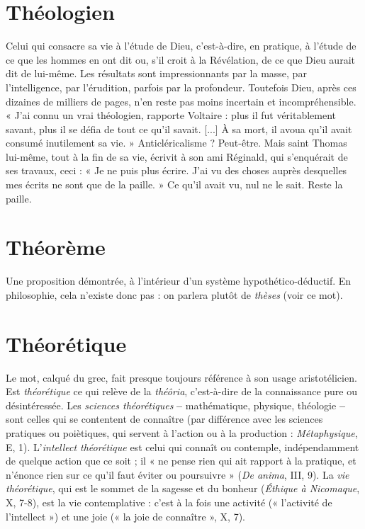 \section{Théologien}
Celui qui consacre sa vie à l’étude de Dieu, c’est-à-dire, en
pratique, à l'étude de ce que les hommes en ont dit ou, s’il
croit à la Révélation, de ce que Dieu aurait dit de lui-même. Les résultats sont
impressionnants par la masse, par l'intelligence, par l’érudition, parfois par la
profondeur. Toutefois Dieu, après ces dizaines de milliers de pages, n’en reste
pas moins incertain et incompréhensible. « J’ai connu un vrai théologien, rapporte
Voltaire : plus il fut véritablement savant, plus il se défia de tout ce qu'il
savait. [...] À sa mort, il avoua qu’il avait consumé inutilement sa vie. »
Anticléricalisme ? Peut-être. Mais saint Thomas lui-même, tout à la fin de sa
vie, écrivit à son ami Réginald, qui s’enquérait de ses travaux, ceci : « Je ne puis
plus écrire. J'ai vu des choses auprès desquelles mes écrits ne sont que de la
paille. » Ce qu’il avait vu, nul ne le sait. Reste la paille.

\section{Théorème}
Une proposition démontrée, à l’intérieur d’un système hypothético-déductif.
En philosophie, cela n’existe donc pas : on
parlera plutôt de {\it thèses} (voir ce mot).

\section{Théorétique}
Le mot, calqué du grec, fait presque toujours référence à
son usage aristotélicien. Est {\it théorétique} ce qui relève de la
{\it théôria}, c’est-à-dire de la connaissance pure ou désintéressée. Les {\it sciences théorétiques}
{\bf --} mathématique, physique, théologie {\bf --} sont celles qui se contentent de
connaître (par différence avec les sciences pratiques ou poiètiques, qui servent
à l’action ou à la production : {\it Métaphysique}, E, 1). L’{\it intellect théorétique} est
celui qui connaît ou contemple, indépendamment de quelque action que ce
soit ; il « ne pense rien qui ait rapport à la pratique, et n’énonce rien sur ce qu’il
faut éviter ou poursuivre » ({\it De anima}, III, 9). La {\it vie théorétique}, qui est le
sommet de la sagesse et du bonheur ({\it Éthique à Nicomaque}, X, 7-8), est la vie
contemplative : c’est à la fois une activité (« l’activité de l’intellect ») et une joie
(« la joie de connaître », X, 7).

